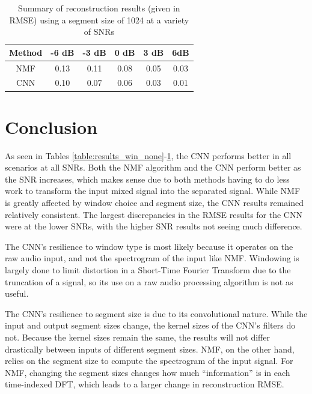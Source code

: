 \documentclass[12pt,chapterheads]{ucsd}
\begin{document}
\vspace{0.25in}
\begin{table}[!ht]
\caption{Summary of reconstruction results (given in RMSE) using a segment size of 1024 at a variety of SNRs}

\vspace{-0.25in}
\begin{center}
\begin{tabular}{| c | c | c |  c | c | c |}

\hline
Method & -6 dB & -3 dB & 0 dB & 3 dB & 6dB \\

\hline
NMF & 0.13 & 0.11 & 0.08 & 0.05 & 0.03 \\

\hline
CNN & 0.10 & 0.07 & 0.06 & 0.03 & 0.01 \\

\hline
\end{tabular}
\end{center}
\label{table:results_seg_1024}
\end{table}

\section{Conclusion}
As seen in Tables \ref{table:results_win_none}-\ref{table:results_seg_1024}, the CNN performs better in all scenarios at all SNRs. Both the NMF algorithm and the CNN perform better as the SNR increases, which makes sense due to both methods having to do less work to transform the input mixed signal into the separated signal. While NMF is greatly affected by window choice and segment size, the CNN results remained relatively consistent. The largest discrepancies in the RMSE results for the CNN were at the lower SNRs, with the higher SNR results not seeing much difference.

The CNN's resilience to window type is most likely because it operates on the raw audio input, and not the spectrogram of the input like NMF. Windowing is largely done to limit distortion in a Short-Time Fourier Transform due to the truncation of a signal, so its use on a raw audio processing algorithm is not as useful.

The CNN's resilience to segment size is due to its convolutional nature. While the input and output segment sizes change, the kernel sizes of the CNN's filters do not. Because the kernel sizes remain the same, the results will not differ drastically between inputs of different segment sizes. NMF, on the other hand, relies on the segment size to compute the spectrogram of the input signal. For NMF, changing the segment sizes changes how much ``information'' is in each time-indexed DFT, which leads to a larger change in reconstruction RMSE.
\end{document}
